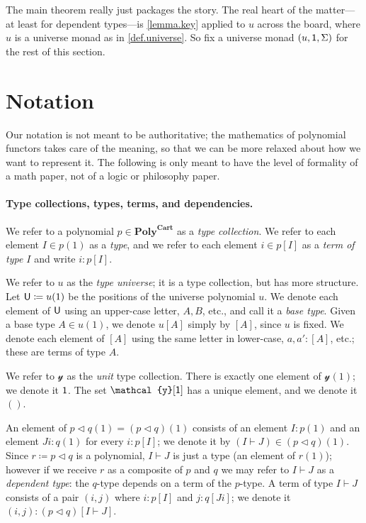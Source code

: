 \documentclass[11pt, one side, article]{memoir}
\theoremstyle{definition}
\theoremstyle{plain}
\newcommand{\Cat}[1]{\mathbf{#1}}%
\newcommand{\tn}[1]{\textnormal{#1}}
\newcommand{\yon}{\mathcal{y}}
\newcommand{\poly}{\Cat{Poly}}
\newcommand{\polycart}{\poly^{\Cat{Cart}}}
\newcommand{\0}{\textsf{0}}
\newcommand{\1}{\tn{\textsf{1}}}
\newcommand{\U}{\tn{\textsf{U}}}
\newcommand{\tri}{\mathbin{\triangleleft}}
\begin{document}
The main theorem really just packages the story. The real heart of the matter---at least for dependent types---is \cref{lemma.key} applied to $u$ across the board, where $u$ is a universe monad as in \cref{def.universe}. So fix a universe monad $(u,\1,\Sigma)$ for the rest of this section.

\section{Notation}

Our notation is not meant to be authoritative; the mathematics of polynomial functors takes care of the meaning, so that we can be more relaxed about how we want to represent it. The following is only meant to have the level of formality of a math paper, not of a logic or philosophy paper.

\paragraph{Type collections, types, terms, and dependencies.}
We refer to a polynomial $p\in\polycart$ as a \emph{type collection}. We refer to each element $I\in p(1)$ as a \emph{type}, and we refer to each element $i\in p[I]$ as a \emph{term of type $I$} and write $i:p[I]$.

We refer to $u$ as the \emph{type universe}; it is a type collection, but has more structure. Let $\U\coloneqq u(1)$ be the positions of the universe polynomial $u$. We denote each element of $\U$ using an upper-case letter, $A,B$, etc., and call it a \emph{base type}. Given a base type $A\in u(1)$, we denote $u[A]$ simply by $[A]$, since $u$ is fixed. We denote each element of $[A]$ using the same letter in lower-case, $a,a':[A]$, etc.; these are terms of type $A$.

We refer to $\yon$ as the \emph{unit} type collection. There is exactly one element of $\yon(1)$; we denote it $\1$. The set $\yon[\1]$ has a unique element, and we denote it $()$.

An element of $p\tri q(1)=(p\tri q)(1)$ consists of an element $I:p(1)$ and an element $J i:q(1)$ for every $i:p[I]$; we denote it by $(I\vdash J)\in (p\tri q)(1)$. Since $r\coloneqq p\tri q$ is a polynomial, $I\vdash J$ is just a type (an element of $r(1)$); however if we receive $r$ as a composite of $p$ and $q$ we may refer to $I\vdash J$ as a \emph{dependent type}: the $q$-type depends on a term of the $p$-type. A term of type $I\vdash J$ consists of a pair $(i,j)$ where $i:p[I]$ and $j: q[J i]$; we denote it $(i,j):(p\tri q)[I\vdash J]$.
\end{document}
